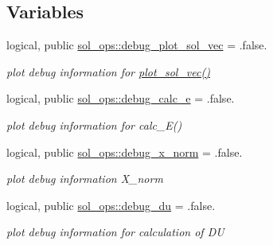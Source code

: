 \subsection*{Variables}
\begin{DoxyCompactItemize}
\item 
logical, public \hyperlink{namespacesol__ops_ae1de852dfaa7f74c5b4a32f85d0a5962}{sol\+\_\+ops\+::debug\+\_\+plot\+\_\+sol\+\_\+vec} = .false.
\begin{DoxyCompactList}\small\item\em plot debug information for \hyperlink{namespacesol__ops_ae14af60a6f8f77e7dde1e93dbaa7e6d0}{plot\+\_\+sol\+\_\+vec()} \end{DoxyCompactList}\item 
logical, public \hyperlink{namespacesol__ops_a05f842d6d83f283aaaf61de0ed4eff3b}{sol\+\_\+ops\+::debug\+\_\+calc\+\_\+e} = .false.
\begin{DoxyCompactList}\small\item\em plot debug information for calc\+\_\+\+E() \end{DoxyCompactList}\item 
logical, public \hyperlink{namespacesol__ops_a8575f14004ff2fb08fe4cfaa647e8828}{sol\+\_\+ops\+::debug\+\_\+x\+\_\+norm} = .false.
\begin{DoxyCompactList}\small\item\em plot debug information {\ttfamily X\+\_\+norm} \end{DoxyCompactList}\item 
logical, public \hyperlink{namespacesol__ops_a95fab1286b819b1c0ccf3ab320d1432a}{sol\+\_\+ops\+::debug\+\_\+du} = .false.
\begin{DoxyCompactList}\small\item\em plot debug information for calculation of {\ttfamily DU} \end{DoxyCompactList}\end{DoxyCompactItemize}
